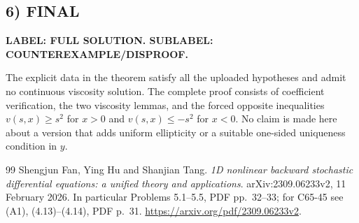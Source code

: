 \documentclass[11pt,a4paper]{article}
\theoremstyle{definition}
\newcommand{\disproof}{\textbf{LABEL: FULL SOLUTION. SUBLABEL: COUNTEREXAMPLE/DISPROOF.}}
\begin{document}
\subsection*{6) FINAL}
\disproof

The explicit data in the theorem satisfy all the uploaded hypotheses and admit no continuous viscosity solution. The complete proof consists of coefficient verification, the two viscosity lemmas, and the forced opposite inequalities $v(s,x)\ge s^2$ for $x>0$ and $v(s,x)\le-s^2$ for $x<0$. No claim is made here about a version that adds uniform ellipticity or a suitable one-sided uniqueness condition in $y$.

\clearpage
\begin{thebibliography}{99}
Shengjun Fan, Ying Hu and Shanjian Tang. \emph{1D nonlinear backward stochastic differential equations: a unified theory and applications}. arXiv:2309.06233v2, 11 February 2026. In particular Problems 5.1--5.5, PDF pp.\ 32--33; for C65-45 see (A1), (4.13)--(4.14), PDF p.\ 31. \url{https://arxiv.org/pdf/2309.06233v2}.

\end{thebibliography}
\end{document}
